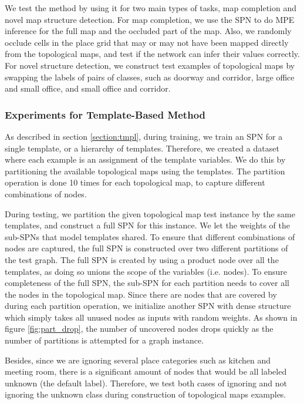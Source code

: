 \documentclass[10pt, titlepage]{article}
\theoremstyle{definition}
\begin{document}
We test the method by using it for two main types of tasks, map completion and novel map structure detection. For map completion, we use the SPN to do MPE inference for the full map and the occluded part of the map. Also, we randomly occlude cells in the place grid that may or may not have been mapped directly from the topological maps, and test if the network can infer their values correctly. For novel structure detection, we construct test examples of topological maps by swapping the labels of pairs of classes, such as doorway and corridor, large office and small office, and small office and corridor.

\subsubsection{Experiments for Template-Based Method}\label{section:exp-tmpl}

As described in section \ref{section:tmpl}, during training, we train an SPN for a single template, or a hierarchy of templates. Therefore, we created a dataset where each example is an assignment of the template variables. We do this by partitioning the available topological maps using the templates. The partition operation is done 10 times for each topological map, to capture different combinations of nodes.

During testing, we partition the given topological map test instance by the same templates, and construct a full SPN for this instance. We let the weights of the sub-SPNs that model templates shared.  To ensure that different combinations of nodes are captured, the full SPN is constructed over two different partitions of the test graph. The full SPN is created by using a product node over all the templates, as doing so unions the scope of the variables (i.e. nodes). To ensure completeness of the full SPN, the sub-SPN for each partition needs to cover all the nodes in the topological map. Since there are nodes that are covered by during each partition operation, we initialize another SPN with dense structure which simply takes all unused nodes as inputs with random weights. As shown in figure \ref{fig:part_drop}, the number of uncovered nodes drops quickly as the number of partitions is attempted for a graph instance.

Besides, since we are ignoring several place categories such as kitchen and meeting room, there is a significant amount of nodes that would be all labeled unknown (the default label). Therefore, we test both cases of ignoring and not ignoring the unknown class during construction of topological maps examples.
\end{document}
